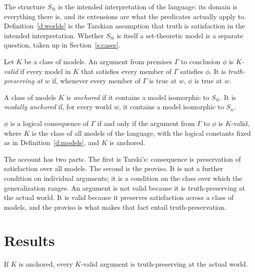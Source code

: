 \documentclass{situationist-preprint}
\begin{document}
The structure $S_@$ is the intended interpretation of the language: its domain is everything there is, and its extensions are what the predicates actually apply to. Definition~\ref{d:worlds} is the Tarskian assumption that truth is satisfaction in the intended interpretation. Whether $S_@$ is itself a set-theoretic model is a separate question, taken up in Section~\ref{s:cases}.

\begin{definition}\label{d:valid}
Let $K$ be a class of models. An argument from premises $\Gamma$ to conclusion $\phi$ is \emph{$K$-valid} if every model in $K$ that satisfies every member of $\Gamma$ satisfies $\phi$. It is \emph{truth-preserving at} $w$ if, whenever every member of $\Gamma$ is true at $w$, $\phi$ is true at $w$.
\end{definition}

\begin{definition}\label{d:anchor}
A class of models $K$ is \emph{anchored} if it contains a model isomorphic to $S_@$. It is \emph{modally anchored} if, for every world $w$, it contains a model isomorphic to $S_w$.
\end{definition}

\begin{principle}\label{p:account}
$\phi$ is a logical consequence of $\Gamma$ if and only if the argument from $\Gamma$ to $\phi$ is $K$-valid, where $K$ is the class of all models of the language, with the logical constants fixed as in Definition~\ref{d:models}, and $K$ is anchored.
\end{principle}

The account has two parts. The first is Tarski's: consequence is preservation of satisfaction over all models. The second is the proviso. It is not a further condition on individual arguments; it is a condition on the class over which the generalization ranges. An argument is not valid because it is truth-preserving at the actual world. It is valid because it preserves satisfaction across a class of models, and the proviso is what makes that fact entail truth-preservation.

\section{Results}\label{s:results}

\begin{theorem}\label{t:reliable}
If $K$ is anchored, every $K$-valid argument is truth-preserving at the actual world.
\end{theorem}
\end{document}
